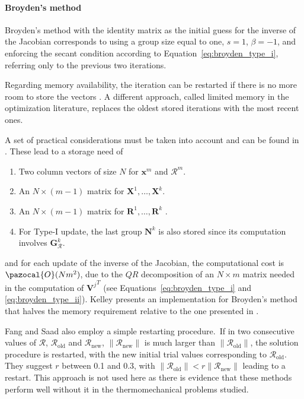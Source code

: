           \paragraph{Broyden's method} Broyden's method \citep{broydenClassMethodsSolving1965a} with the identity matrix as the initial guess for the inverse of the Jacobian corresponds to using a group size equal to one, \(s=1\), \(\beta=-1\), and enforcing the secant condition according to Equation~\eqref{eq:broyden_type_i}, referring only to the previous two iterations.

          Regarding memory availability, the iteration can be restarted if there is no more room to store the vectors \citep{kelleySolvingNonlinearEquations2003}.
          A different approach, called limited memory in the optimization literature, replaces the oldest stored iterations with the most recent ones.

          A set of practical considerations must be taken into account and can be found in \cite{fang_two_2009}.
          These lead to a storage need of
          \begin{enumerate}
          \item  Two column vectors of size \(N\) for \(\mathbf{x}^{m}\) and \(\bm{\mathcal{R}}^{m}\).
          \item An \(N \times(m-1)\) matrix for \(\mathbf{X}^{1}, \ldots, \mathbf{X}^{k}\).
          \item An \(N \times(m-1)\) matrix for \(\mathbf{R}^{1}, \ldots, \mathbf{R}^{k}\) .
          \item For Type-I update, the last group \(\mathbf N^{k}\) is also stored since its computation involves \(\mathbf{G}_{\bm{\mathcal{R}}}^{k}\).
          \end{enumerate}
          and for each update of the inverse of the Jacobian, the computational cost is \(\pazocal{O}(Nm^2)\), due to the \(QR\) decomposition of an \(N\times m\) matrix needed in the computation of \({\mathbf V^j}^T\) (see Equations~\eqref{eq:broyden_type_i} and \eqref{eq:broyden_type_ii}).
          Kelley \citep{kelley_solving_2003} presents an implementation for Broyden's method that halves the memory requirement relative to the one presented in \cite{fang_two_2009}.

          Fang and Saad \citep{fang_two_2009} also employ a simple restarting procedure.\
          If in two consecutive values of \(\bm{\mathcal{R}}\), \(\bm{\mathcal{R}}_\text{old}\) and \(\bm{\mathcal{R}}_\text{new}\), \(\|\bm{\mathcal{R}}_\text{new}\|\) is much larger than \(\|\bm{\mathcal{R}}_\text{old}\|\), the solution procedure is restarted, with the new initial trial values corresponding to \(\bm{\mathcal{R}}_\text{old}\).
          They suggest \(r\) between 0.1 and 0.3, with \(\|\bm{\mathcal{R}}_\text{old}\| < r\|\bm{\mathcal{R}}_\text{new}\|\) leading to a restart.
          This approach is not used here as there is evidence that these methods perform well without it in the thermomechanical problems studied.


